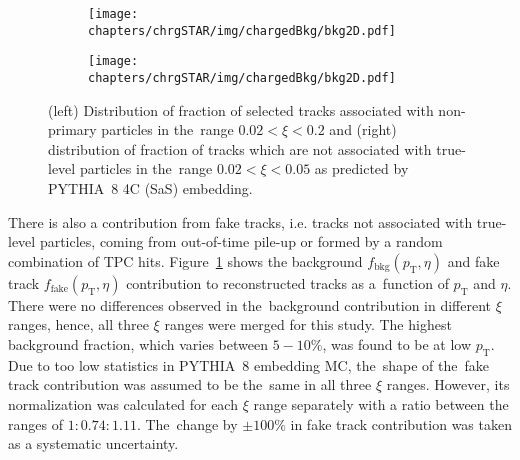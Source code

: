 \begin{figure}[h!]
	\centering
	\begin{subfigure}{.45\textwidth}
		\texttt{[image: chapters/chrgSTAR/img/chargedBkg/bkg2D.pdf]}
	\end{subfigure}
	\begin{subfigure}{.45\textwidth}
		\texttt{[image: chapters/chrgSTAR/img/chargedBkg/bkg2D.pdf]}
	\end{subfigure}
\begin{comment}
	\begin{subfigure}{.45\textwidth}
		\texttt{[image: chapters/chrgSTAR/img/chargedBkg/bkg2D.pdf]}
	\end{subfigure}
	\begin{subfigure}{.45\textwidth}
		\texttt{[image: chapters/chrgSTAR/img/chargedBkg/bkg2D.pdf]}
	\end{subfigure}
\end{comment}
	\caption{(left) Distribution of fraction of selected tracks  associated with non-primary particles  in the~range $0.02<\xi<0.2$ and  (right) distribution of fraction of tracks which are not associated with true-level particles  in the~range $0.02<\xi<0.05$ as predicted by PYTHIA~8 4C (SaS) embedding.}
	\label{fig:bkg_fake_charged}
\end{figure}
There is also a contribution from fake tracks, i.e. tracks not associated with true-level particles, coming from out-of-time pile-up or  formed by a random combination of TPC hits. Figure~\ref{fig:bkg_fake_charged} shows the background $f_{\textrm{bkg}}\left(p_{\textrm{T}},\eta\right)$ and fake track $f_{\textrm{fake}}\left(p_{\textrm{T}},\eta\right)$ contribution to reconstructed tracks as a~function of $p_{\textrm{T}}$ and $\eta$. There were no differences observed in the~background contribution in different $\xi$ ranges, hence, all three $\xi$ ranges were merged for this study. The highest background fraction, which varies between $5-10\%$, was found to be at low $p_{\textrm{T}}$.  Due to too low statistics in PYTHIA~8 embedding \ac{MC}, the~shape of the~fake track contribution was assumed to be the~same in all three $\xi$ ranges. However, its normalization was calculated for each $\xi$ range separately with a ratio between the ranges of $1: 0.74: 1.11$.
The~change by $\pm100\%$ in fake track contribution was taken as a systematic uncertainty.




